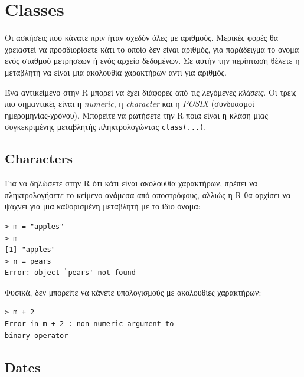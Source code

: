 \documentclass[a4paper,11pt,twocolumn,tablecaptionabove]{scrartcl}
\begin{document}
\section{Classes}

Οι ασκήσεις που κάνατε πριν ήταν σχεδόν όλες με αριθμούς. Μερικές φορές θα χρειαστεί να προσδιορίσετε κάτι το 
οποίο δεν είναι αριθμός, για παράδειγμα το όνομα ενός σταθμού μετρήσεων ή ενός αρχείο δεδομένων. Σε αυτήν την
περίπτωση θέλετε η μεταβλητή να είναι μια ακολουθία χαρακτήρων αντί για αριθμός. 

Ένα αντικείμενο στην R μπορεί να έχει διάφορες από τις λεγόμενες \emph{κλάσεις}. Οι τρεις πιο σημαντικές είναι
η \emph{numeric}, η \emph{character} και η \emph{POSIX} (συνδυασμοί ημερομηνίας-χρόνου). Μπορείτε να ρωτήσετε
την R ποια είναι η κλάση μιας συγκεκριμένης μεταβλητής πληκτρολογώντας \texttt{class(...)}. 

\subsection{Characters}
\label{sec:characters}

Για να δηλώσετε στην R ότι κάτι είναι ακολουθία χαρακτήρων, πρέπει να πληκτρολογήσετε το κείμενο ανάμεσα από
αποστρόφους, αλλιώς η R θα αρχίσει να ψάχνει για μια καθορισμένη μεταβλητή με το ίδιο όνομα:

\begin{Verbatim}[frame=single,gobble=0]
> m = "apples"
> m
[1] "apples"
> n = pears
Error: object `pears' not found
\end{Verbatim}

Φυσικά, δεν μπορείτε να κάνετε υπολογισμούς με ακολουθίες χαρακτήρων:

\begin{Verbatim}[frame=single,gobble=0]
> m + 2
Error in m + 2 : non-numeric argument to 
binary operator
\end{Verbatim}

\subsection{Dates}
\end{document}
